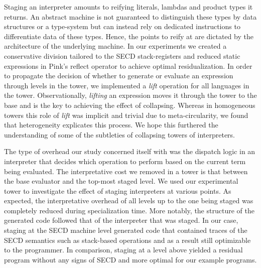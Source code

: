\documentclass[sigplan,anonymous,review]{acmart}
\theoremstyle{definition}
\begin{document}
Staging an interpreter amounts to reifying literals, lambdas and product types it returns. An abstract machine is not guaranteed to distinguish these types by data structures or a type-system but can instead rely on dedicated instructions to differentiate data of these types. Hence, the points to reify at are dictated by the architecture of the underlying machine. In our experiments we created a conservative division tailored to the SECD stack-registers and reduced static expressions in Pink's reflect operator to achieve optimal residualization. In order to propagate the decision of whether to generate or evaluate an expression through levels in the tower, we implemented a \textit{lift} operation for all languages in the tower. Observationally, \textit{lifting} an expression moves it through the tower to the base and is the key to achieving the effect of collapsing. Whereas in homogeneous towers this role of \textit{lift} was implicit and trivial due to meta-circularity, we found that heterogeneity explicates this process. We hope this furthered the understanding of some of the subtleties of collapsing towers of interpreters.

The type of overhead our study concerned itself with was the dispatch logic in an interpreter that decides which operation to perform based on the current term being evaluated. The interpretative cost we removed in a tower is that between the base evaluator and the top-most staged level. We used our experimental tower to investigate the effect of staging interpreters at various points. As expected, the interpretative overhead of all levels up to the one being staged was completely reduced during specialization time. More notably, the structure of the generated code followed that of the interpreter that was staged. In our case, staging at the SECD machine level generated code that contained traces of the SECD semantics such as stack-based operations and as a result still optimizable to the programmer. In comparison, staging at a level above yielded a residual program without any signs of SECD and more optimal for our example programs.
\end{document}
